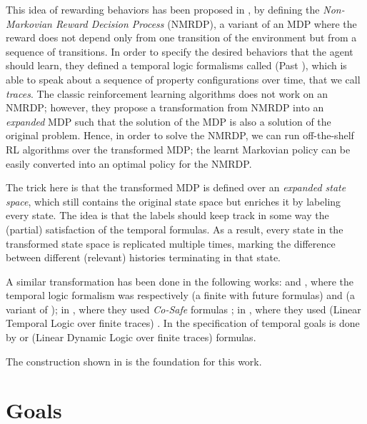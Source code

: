 \medskip

This idea of rewarding behaviors has been proposed in \citep{bacchus1996rewarding}, by defining the \emph{Non-Markovian Reward Decision Process} (NMRDP), a variant of an MDP where the reward does not depend only from one transition of the environment but from a sequence of transitions. In order to specify the desired behaviors that the agent should learn, they defined a temporal logic formalisms called \PLTL (Past \LTL), which is able to speak about a sequence of property configurations over time, that we call \emph{traces}. The classic reinforcement learning algorithms does not work on an NMRDP; however, they propose a transformation from NMRDP into an \emph{expanded} MDP such that the solution of the MDP is also a solution of the original problem. Hence, in order to solve the NMRDP, we can run off-the-shelf RL algorithms over the transformed MDP; the learnt Markovian policy can be easily converted into an optimal policy for the NMRDP.

The trick here is that the transformed MDP is defined over an \emph{expanded state space}, which still contains the original state space but enriches it by labeling every state. The idea is that the labels should keep track in some way the (partial) satisfaction of the temporal formulas. As a result, every state in the transformed state space is replicated multiple times, marking the difference between different (relevant) histories terminating in that state.

\medskip
A similar transformation has been done in the following works: 
\citep{ThiebauxGSPK06} and \citep{gretton2014more}, where the temporal logic formalism was respectively \FLTL (a finite \LTL with future formulas) and \FstarLTL (a variant of \FLTL); 
in \citep{icarte2018teaching}, where they used \emph{Co-Safe} \LTL formulas \citep{Kupferman:2001:MCS:569028.569032, Lacerda:2015:OPG:2832415.2832470};
in \citep{CamachoCSM17, CamachoCSM17b}, where they used \LTLf (Linear Temporal Logic over finite traces) \citep{de2013linear}.
In \citep{AAAI1817342} the specification of temporal goals is done by \LTLf or \LDLf (Linear Dynamic Logic over finite traces) formulas.

The construction shown in \citep{AAAI1817342} is the foundation for this work.


\section{Goals}\label{sect:intro-goals}

